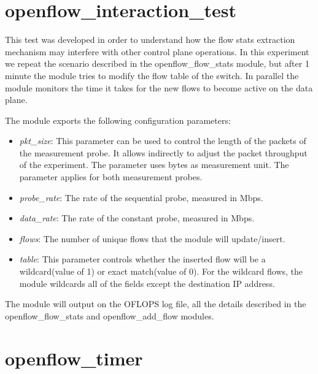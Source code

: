 \documentclass{book}
\begin{document}
\section{openflow\_interaction\_test}

This test was developed in order to understand how the flow stats extraction
mechanism may interfere with other control plane operations. In this experiment
we repeat the scenario described in the openflow\_flow\_stats module, but
after 1 minute the module tries to modify the flow table of the switch. In
parallel the module monitors the time it takes for the new flows to become
active on the data plane. 

The module exports the following configuration parameters:
\begin{itemize}
    \item \emph{pkt\_size}: This parameter can be used to control the length of the
        packets of the measurement probe. It allows indirectly to adjust the packet
        throughput of the experiment. The parameter uses bytes as measurement unit.
        The parameter applies for both measurement probes.
    \item \emph{probe\_rate}: The rate of the sequential probe, measured in
        Mbps.
    \item \emph{data\_rate}: The rate of the constant probe, measured in Mbps.
    \item \emph{flows}:  The number of unique flows that the module will
        update/insert.
    \item \emph{table}:  This parameter controls whether the inserted flow will
        be
        a wildcard(value of 1) or exact match(value of 0). For the wildcard 
        flows, the module wildcards all of the fields except the destination IP address.
\end{itemize}

The module will output on the OFLOPS log file, all the details described in the
openflow\_flow\_stats and openflow\_add\_flow modules. 

\section{openflow\_timer}
\end{document}
